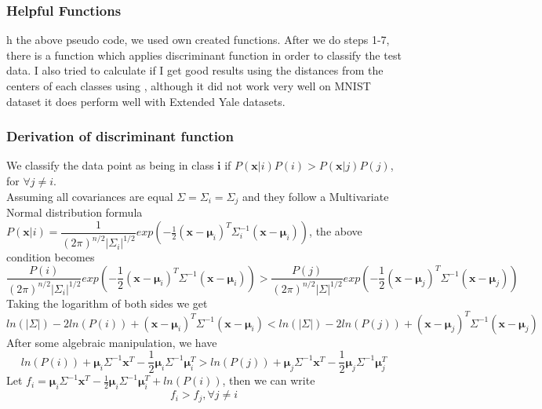 \subsubsection{Helpful Functions}

h the above pseudo code, we used own created functions. After we do steps 1-7, there is a function  which applies discriminant function in order to classify the test data. I also tried to calculate if I get good results using the distances from the centers of each classes using , although it did not work very well on MNIST dataset it does perform well with Extended Yale datasets.

\subsubsection{Derivation of discriminant function}
We classify the data point as being in class $\pmb i$ if
\(P(\pmb x|i) P(i) > P(\pmb x|j) P(j)\), for $\forall j\neq i$. \\
Assuming all covariances are equal $\Sigma = \Sigma_i = \Sigma_j$ and they follow a Multivariate Normal distribution formula $P(\pmb x| i) = \dfrac{1}{(2 \pi)^{n/2} |\Sigma_i|^{1/2}} exp(-\frac{1}{2} (\pmb x - \pmb \mu_i)^T \Sigma_i^{-1} (\pmb x - \pmb \mu_i))$, the above condition becomes
\[
\dfrac{P(i)}{(2 \pi)^{n/2} |\Sigma_i|^{1/2}} exp(-\frac{1}{2} (\pmb x - \pmb \mu_i)^T \Sigma^{-1} (\pmb x - \pmb \mu_i) ) > \dfrac{P(j)}{(2 \pi)^{n/2} |\Sigma|^{1/2}} exp(-\frac{1}{2} (\pmb x - \pmb \mu_j)^T \Sigma^{-1} (\pmb x - \pmb \mu_j) )
\]
	Taking the logarithm of both sides we get 
	\[
	ln(|\Sigma|) - 2 ln(P(i)) + (\pmb x - \pmb \mu_i)^T \Sigma^{-1} (\pmb x - \pmb \mu_i) < ln(|\Sigma|) - 2 ln(P(j)) + (\pmb x - \pmb \mu_j)^T \Sigma^{-1} (\pmb x - \pmb \mu_j)
	\]
	After some algebraic manipulation, we have 
		\[
		ln(P(i)) + \pmb \mu_i \Sigma^{-1} \pmb x^T - \frac{1}{2} \pmb \mu_i \Sigma^{-1} \pmb \mu_i^T > ln(P(j)) + \pmb \mu_j \Sigma^{-1} \pmb x^T - \frac{1}{2} \pmb \mu_j \Sigma^{-1} \pmb \mu_j^T    
		\]
		Let $f_i =  \pmb \mu_i \Sigma^{-1} \pmb x^T - \frac{1}{2} \pmb \mu_i \Sigma^{-1} \pmb \mu_i^T + ln(P(i))$, then we can write 
		\[
		f_i > f_j, \forall j\neq i
		\]